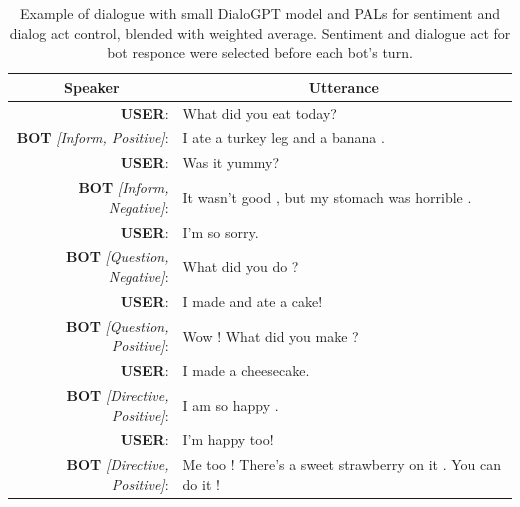 \documentclass[11pt]{article}
\begin{document}
\begin{table}[]
\begin{tabular}{rl}
\multicolumn{1}{c}{Speaker}    & \multicolumn{1}{c}{Utterance}                               \\ \hline
\textbf{USER}:                          & What did you eat today?                                     \\
\textbf{BOT} \textit{{[}Inform, Positive{]}}:    & I ate a turkey leg and a banana .                           \\
\textbf{USER}:                          & Was it yummy?                                               \\
\textbf{BOT} \textit{{[}Inform, Negative{]}}:    & It wasn't good , but my stomach was horrible .              \\
\textbf{USER}:                          & I'm so sorry.                                               \\
\textbf{BOT} \textit{{[}Question, Negative{]}}:  & What did you do ?                                           \\
\textbf{USER}:                          & I made and ate a cake!                                      \\
\textbf{BOT} \textit{{[}Question, Positive{]}}:  & Wow ! What did you make ?                                   \\
\textbf{USER}:                          & I made a cheesecake.                                        \\
\textbf{BOT} \textit{{[}Directive, Positive{]}}: & I am so happy .                                             \\
\textbf{USER}:                          & I'm happy too!                                              \\
\textbf{BOT} \textit{{[}Directive, Positive{]}}: & Me too ! There's a sweet strawberry on it . You can do it !
\end{tabular}
\caption{Example of dialogue with small DialoGPT model and PALs for sentiment and dialog act control, blended with weighted average. Sentiment and dialogue act for bot responce were selected before each bot's turn.}
\label{tab:cake_example_dialogue}
\end{table}
    
\end{document}
